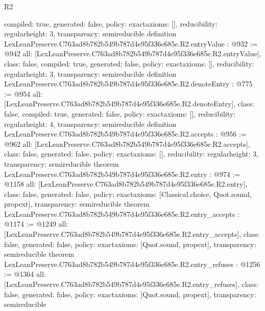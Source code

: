 \begin{lexlean}{R2}
\begin{coremodule}
{  compiled: true,
  generated: false,
  policy: exact{axioms: []},
  reducibility: regular{height: 3},
  transparency: semireducible
}
definition LexLeanPreserve.C763ad8b782b549b787d4e95f336e685e.R2.entryValue : @932 := @942 {
  all: [LexLeanPreserve.C763ad8b782b549b787d4e95f336e685e.R2.entryValue],
  class: false,
  compiled: true,
  generated: false,
  policy: exact{axioms: []},
  reducibility: regular{height: 3},
  transparency: semireducible
}
definition LexLeanPreserve.C763ad8b782b549b787d4e95f336e685e.R2.denoteEntry : @775 := @954 {
  all: [LexLeanPreserve.C763ad8b782b549b787d4e95f336e685e.R2.denoteEntry],
  class: false,
  compiled: true,
  generated: false,
  policy: exact{axioms: []},
  reducibility: regular{height: 4},
  transparency: semireducible
}
definition LexLeanPreserve.C763ad8b782b549b787d4e95f336e685e.R2.accepts : @956 := @962 {
  all: [LexLeanPreserve.C763ad8b782b549b787d4e95f336e685e.R2.accepts],
  class: false,
  generated: false,
  policy: exact{axioms: []},
  reducibility: regular{height: 3},
  transparency: semireducible
}
theorem LexLeanPreserve.C763ad8b782b549b787d4e95f336e685e.R2.entry : @974 := @1158 {
  all: [LexLeanPreserve.C763ad8b782b549b787d4e95f336e685e.R2.entry],
  class: false,
  generated: false,
  policy: exact{axioms: [Classical.choice, Quot.sound, propext]},
  transparency: semireducible
}
theorem LexLeanPreserve.C763ad8b782b549b787d4e95f336e685e.R2.entry_accepts : @1174 := @1249 {
  all: [LexLeanPreserve.C763ad8b782b549b787d4e95f336e685e.R2.entry_accepts],
  class: false,
  generated: false,
  policy: exact{axioms: [Quot.sound, propext]},
  transparency: semireducible
}
theorem LexLeanPreserve.C763ad8b782b549b787d4e95f336e685e.R2.entry_refuses : @1256 := @1364 {
  all: [LexLeanPreserve.C763ad8b782b549b787d4e95f336e685e.R2.entry_refuses],
  class: false,
  generated: false,
  policy: exact{axioms: [Quot.sound, propext]},
  transparency: semireducible
}


\end{coremodule}
\end{lexlean}
